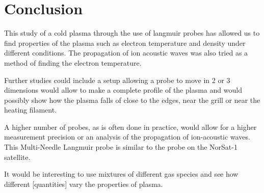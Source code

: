 \section{Conclusion}
This study of a cold plasma through the use of langmuir probes has allowed us to find properties of the plasma such as electron temperature and density under different conditions. The propagation of ion acoustic waves was also tried as a method of finding the electron temperature.

Further studies could include a setup allowing a probe to move in 2 or 3 dimensions would allow to make a complete profile of the plasma and would possibly show how the plasma falls of close to the edges, near the grill or near the heating filament.

A higher number of probes, as is often done in practice, would allow for a higher measurement precision or an analysis of the propagation of ion-acoustic waves. This Multi-Needle Langmuir probe is similar to the probe on the NorSat-1 satellite.

It would be interesting to use mixtures of different gas species and see how different [quantities] vary the properties of plasma.